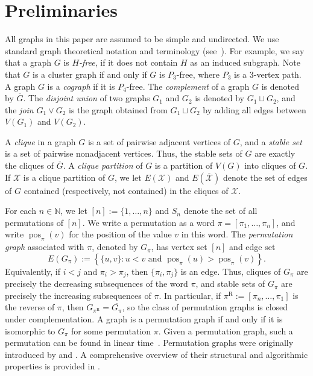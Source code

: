 \documentclass[a4paper,fleqn]{cas-sc}
\theoremstyle{remark}
\theoremstyle{plain}
\newcommand{\defn}[1]{\emph{#1}}
\begin{document}
\section{Preliminaries}

All graphs in this paper are assumed to be simple and undirected. We use standard graph theoretical notation and terminology (see~\cite{diestel25}). For example, we say that a graph $G$ is \defn{$H$-free}, if it does not contain $H$ as an induced subgraph. Note that $G$ is a cluster graph if and only if $G$ is $P_3$-free, where $P_3$ is a 3-vertex path.  A graph $G$ is a \defn{cograph} if
it is $P_4$-free.  The \defn{complement} of a graph $G$ is denoted by $\overline{G}$.  The \defn{disjoint union} of two graphs $G_1$ and $G_2$ is denoted by $G_1 \sqcup G_2$, and the \defn{join} $G_1 \vee G_2$ is the graph obtained from $G_1 \sqcup G_2$ by adding all edges between $V(G_1)$ and $V(G_2)$.

A \defn{clique} in a graph $G$ is a set of pairwise adjacent vertices of $G$, and a \defn{stable set} is a set of pairwise nonadjacent vertices.  Thus, the stable sets of $G$ are exactly the cliques of $\overline{G}$.  A \defn{clique partition} of $G$ is a partition of $V(G)$ into cliques of $G$.  If $\mathcal{X}$ is a clique partition of $G$, we let $E(\mathcal{X})$ and $E(\overline{\mathcal{X}})$ denote the set of edges of $G$ contained (respectively, not contained) in the cliques of $\mathcal{X}$.

For each $n \in \mathbb{N}$, we let $[n]:=\{1, \dots, n\}$ and $S_n$ denote the set of all permutations of $[n]$. We write a permutation as a word
 $\pi = [\pi_1, \dots, \pi_n]$, and write $\operatorname{pos}_\pi(v)$ for the position of the value $v$ in this word. The \defn{permutation graph} associated with $\pi$, denoted by $G_\pi$, has vertex set $[n]$ and edge set
\[
E(G_\pi) := \left\{ \{u,v\} : u<v \text{ and } \operatorname{pos}_\pi(u)>\operatorname{pos}_\pi(v) \right\}.
\]
Equivalently, if $i<j$ and $\pi_i>\pi_j$, then $\{\pi_i,\pi_j\}$ is an edge. Thus, cliques of $G_\pi$ are precisely the decreasing subsequences of the word $\pi$, and stable sets of $G_\pi$ are precisely the increasing subsequences of $\pi$.  In particular, if $\pi^{\mathrm{R}}:=[\pi_n, \dots, \pi_1]$ is the reverse of $\pi$, then $G_{\pi^{\mathrm{R}}}=\overline{G_\pi}$, so the class of permutation graphs is closed under complementation.  A graph is a permutation graph if and only if it is isomorphic to $G_\pi$ for some permutation $\pi$. Given a permutation graph, such a permutation can be found in linear time~\cite{MS99}. Permutation graphs were originally introduced by \cite{EPL1972} and \cite{PLE1971}. A comprehensive overview of their structural and algorithmic properties is provided in \cite{golumbic2004}.
\end{document}
